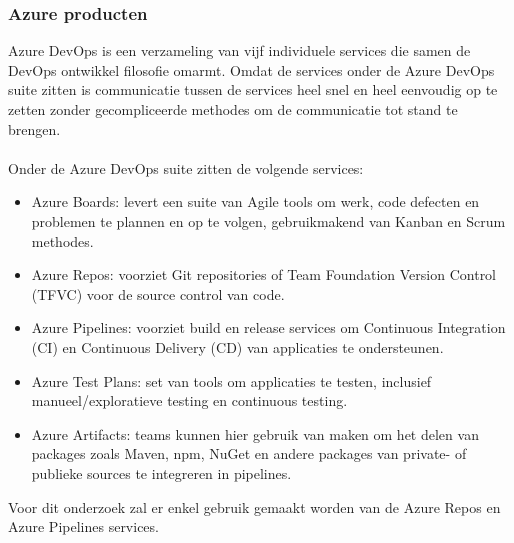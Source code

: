 \subsubsection{Azure producten}
Azure DevOps is een verzameling van vijf individuele services die samen de DevOps ontwikkel filosofie omarmt. Omdat de services onder de Azure DevOps suite zitten is communicatie tussen de services heel snel en heel eenvoudig op te zetten zonder gecompliceerde methodes om de communicatie tot stand te brengen.
\\ \\
Onder de \textcite{Microsoft2024} Azure DevOps suite zitten de volgende services:
\begin{itemize}
    \item Azure Boards: levert een suite van Agile tools om werk, code defecten en problemen te plannen en op te volgen, gebruikmakend van Kanban en Scrum methodes.
    \item Azure Repos: voorziet Git repositories of Team Foundation Version Control (TFVC) voor de source control van code.
    \item Azure Pipelines: voorziet build en release services om Continuous Integration (CI) en Continuous Delivery (CD) van applicaties te ondersteunen.
    \item Azure Test Plans: set van tools om applicaties te testen, inclusief manueel/exploratieve testing en continuous testing.
    \item Azure Artifacts: teams kunnen hier gebruik van maken om het delen van packages zoals Maven, npm, NuGet en andere packages van private- of publieke sources te integreren in pipelines.
\end{itemize}
Voor dit onderzoek zal er enkel gebruik gemaakt worden van de Azure Repos en Azure Pipelines services.
\\ \\
